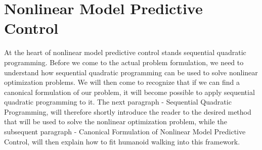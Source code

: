 \FloatBarrier
\section{Nonlinear Model Predictive Control}
\label{sec::212_nmpc}
At the heart of nonlinear model predictive control stands sequential quadratic programming. Before we come to the actual problem formulation, we need to understand how sequential quadratic programming can be used to solve nonlinear optimization problems. We will then come to recognize that if we can find a canonical formulation of our problem, it will become possible to apply sequential quadratic programming to it. The next paragraph - Sequential Quadratic Programming, will therefore shortly introduce the reader to the desired method that will be used to solve the nonlinear optimization problem, while the subsequent paragraph - Canonical Formulation of Nonlinear Model Predictive Control, will then explain how to fit humanoid walking into this framework.
\FloatBarrier
